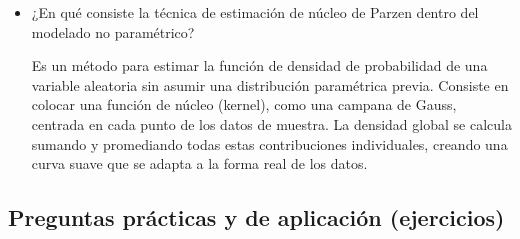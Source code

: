 \documentclass[12pt]{article}
\begin{document}
\begin{itemize}
		\item ¿En qué consiste la técnica de estimación de núcleo de Parzen dentro del modelado no paramétrico?
		
		Es un método para estimar la función de densidad de probabilidad de una variable aleatoria sin asumir una distribución paramétrica previa. Consiste en colocar una función de núcleo (kernel), como una campana de Gauss, centrada en cada punto de los datos de muestra. La densidad global se calcula sumando y promediando todas estas contribuciones individuales, creando una curva suave que se adapta a la forma real de los datos.
	\end{itemize}
	
	\subsection{Preguntas prácticas y de aplicación (ejercicios)}
	
\end{document}

